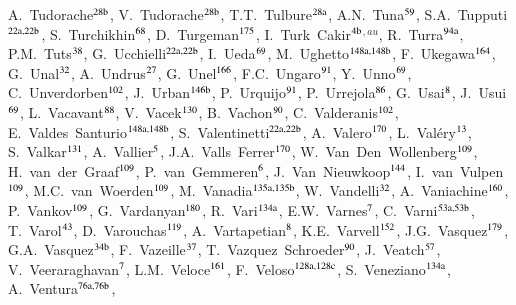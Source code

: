 \begin{flushleft}
A.~Tudorache$^\textrm{\scriptsize 28b}$,
V.~Tudorache$^\textrm{\scriptsize 28b}$,
T.T.~Tulbure$^\textrm{\scriptsize 28a}$,
A.N.~Tuna$^\textrm{\scriptsize 59}$,
S.A.~Tupputi$^\textrm{\scriptsize 22a,22b}$,
S.~Turchikhin$^\textrm{\scriptsize 68}$,
D.~Turgeman$^\textrm{\scriptsize 175}$,
I.~Turk~Cakir$^\textrm{\scriptsize 4b}$$^{,au}$,
R.~Turra$^\textrm{\scriptsize 94a}$,
P.M.~Tuts$^\textrm{\scriptsize 38}$,
G.~Ucchielli$^\textrm{\scriptsize 22a,22b}$,
I.~Ueda$^\textrm{\scriptsize 69}$,
M.~Ughetto$^\textrm{\scriptsize 148a,148b}$,
F.~Ukegawa$^\textrm{\scriptsize 164}$,
G.~Unal$^\textrm{\scriptsize 32}$,
A.~Undrus$^\textrm{\scriptsize 27}$,
G.~Unel$^\textrm{\scriptsize 166}$,
F.C.~Ungaro$^\textrm{\scriptsize 91}$,
Y.~Unno$^\textrm{\scriptsize 69}$,
C.~Unverdorben$^\textrm{\scriptsize 102}$,
J.~Urban$^\textrm{\scriptsize 146b}$,
P.~Urquijo$^\textrm{\scriptsize 91}$,
P.~Urrejola$^\textrm{\scriptsize 86}$,
G.~Usai$^\textrm{\scriptsize 8}$,
J.~Usui$^\textrm{\scriptsize 69}$,
L.~Vacavant$^\textrm{\scriptsize 88}$,
V.~Vacek$^\textrm{\scriptsize 130}$,
B.~Vachon$^\textrm{\scriptsize 90}$,
C.~Valderanis$^\textrm{\scriptsize 102}$,
E.~Valdes~Santurio$^\textrm{\scriptsize 148a,148b}$,
S.~Valentinetti$^\textrm{\scriptsize 22a,22b}$,
A.~Valero$^\textrm{\scriptsize 170}$,
L.~Val\'ery$^\textrm{\scriptsize 13}$,
S.~Valkar$^\textrm{\scriptsize 131}$,
A.~Vallier$^\textrm{\scriptsize 5}$,
J.A.~Valls~Ferrer$^\textrm{\scriptsize 170}$,
W.~Van~Den~Wollenberg$^\textrm{\scriptsize 109}$,
H.~van~der~Graaf$^\textrm{\scriptsize 109}$,
P.~van~Gemmeren$^\textrm{\scriptsize 6}$,
J.~Van~Nieuwkoop$^\textrm{\scriptsize 144}$,
I.~van~Vulpen$^\textrm{\scriptsize 109}$,
M.C.~van~Woerden$^\textrm{\scriptsize 109}$,
M.~Vanadia$^\textrm{\scriptsize 135a,135b}$,
W.~Vandelli$^\textrm{\scriptsize 32}$,
A.~Vaniachine$^\textrm{\scriptsize 160}$,
P.~Vankov$^\textrm{\scriptsize 109}$,
G.~Vardanyan$^\textrm{\scriptsize 180}$,
R.~Vari$^\textrm{\scriptsize 134a}$,
E.W.~Varnes$^\textrm{\scriptsize 7}$,
C.~Varni$^\textrm{\scriptsize 53a,53b}$,
T.~Varol$^\textrm{\scriptsize 43}$,
D.~Varouchas$^\textrm{\scriptsize 119}$,
A.~Vartapetian$^\textrm{\scriptsize 8}$,
K.E.~Varvell$^\textrm{\scriptsize 152}$,
J.G.~Vasquez$^\textrm{\scriptsize 179}$,
G.A.~Vasquez$^\textrm{\scriptsize 34b}$,
F.~Vazeille$^\textrm{\scriptsize 37}$,
T.~Vazquez~Schroeder$^\textrm{\scriptsize 90}$,
J.~Veatch$^\textrm{\scriptsize 57}$,
V.~Veeraraghavan$^\textrm{\scriptsize 7}$,
L.M.~Veloce$^\textrm{\scriptsize 161}$,
F.~Veloso$^\textrm{\scriptsize 128a,128c}$,
S.~Veneziano$^\textrm{\scriptsize 134a}$,
A.~Ventura$^\textrm{\scriptsize 76a,76b}$,
$$
\end{flushleft}
